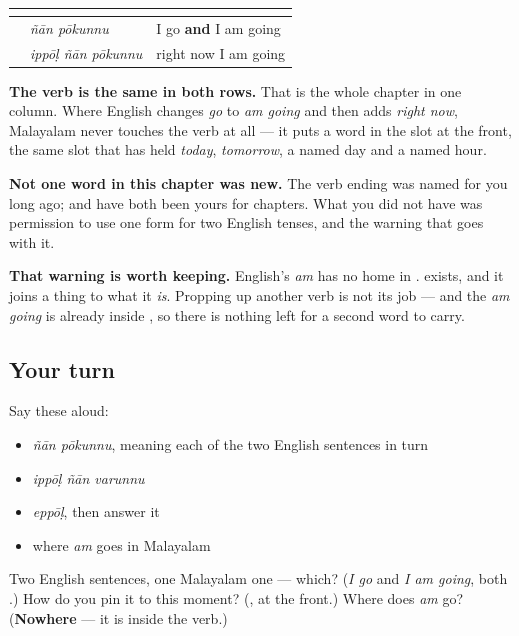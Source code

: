 \begin{grammarlens}[title={Grammar Lens: one form, and a word in front of it}]
\noindent
\begin{tabularx}{\linewidth}{@{}>{\raggedright\arraybackslash}X>{\raggedright\arraybackslash}X>{\raggedright\arraybackslash}X@{}}
\toprule
\textbf{} & \textbf{} & \textbf{} \\
\midrule
\textbf{\ml{ഞാൻ} \ml{പോകുന്നു}} & \emph{ñān pōkunnu} & I go \textbf{and} I am going \\
\textbf{\ml{ഇപ്പോൾ} \ml{ഞാൻ} \ml{പോകുന്നു}} & \emph{ippōḷ ñān pōkunnu} & right now I am going \\
\bottomrule
\end{tabularx}

\textbf{The verb is the same in both rows.} That is the whole chapter in one column. Where English changes \emph{go} to \emph{am going} and then adds \emph{right now}, Malayalam never touches the verb at all — it puts a word in the slot at the front, the same slot that has held \emph{today}, \emph{tomorrow}, a named day and a named hour.
\end{grammarlens}

\begin{grammarlens}[title={What you've built}]
\textbf{Not one word in this chapter was new.} The verb ending was named for you long ago; \textbf{} and \textbf{} have both been yours for chapters. What you did not have was permission to use one form for two English tenses, and the warning that goes with it.

\textbf{That warning is worth keeping.} English's \emph{am} has no home in \textbf{  }. \textbf{} exists, and it joins a thing to what it \emph{is}. Propping up another verb is not its job — and the \emph{am going} is already inside \textbf{}, so there is nothing left for a second word to carry.
\end{grammarlens}

\subsection*{Your turn}
Say these aloud:

\begin{itemize}
\raggedright
  \item \emph{ñān pōkunnu}, meaning each of the two English sentences in turn
  \item \emph{ippōḷ ñān varunnu}
  \item \emph{eppōḷ}, then answer it
  \item where \emph{am} goes in Malayalam
\end{itemize}

\begin{tcolorbox}[breakable,colback=teal!4,colframe=teal!35!black,title={Before you move on}]
Two English sentences, one Malayalam one — which? (\emph{I go} and \emph{I am going}, both \textbf{ }.) How do you pin it to this moment? (\textbf{}, at the front.) Where does \emph{am} go? (\textbf{Nowhere} — it is inside the verb.)
\end{tcolorbox}
